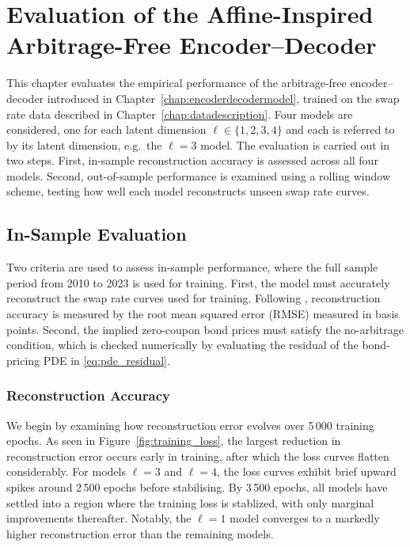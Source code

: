 \chapter{Evaluation of the Affine-Inspired Arbitrage-Free Encoder--Decoder}
\label{chap:evaluation}

This chapter evaluates the empirical performance of the arbitrage-free encoder--decoder introduced in Chapter~\ref{chap:encoderdecodermodel}, trained on the swap rate data described in Chapter~\ref{chap:datadescription}. Four models are considered, one for each latent dimension $\ell \in \{1,2,3,4\}$ and each is referred to by its latent dimension, e.g.\ the $\ell=3$ model. The evaluation is carried out in two steps. First, in-sample reconstruction accuracy
is assessed across all four models. Second, out-of-sample performance is
examined using a rolling window scheme, testing how well each model reconstructs
unseen swap rate curves.


\section{In-Sample Evaluation}
\label{sec:ISevaluation}

Two criteria are used to assess in-sample performance, where the full sample period from 2010 to 2023 is used for training. First, the model must accurately reconstruct the swap rate curves used for training. Following \citet{MatinWanPoulsen2025}, reconstruction accuracy is measured by the root mean squared error (RMSE) measured in basis points. Second, the implied zero-coupon bond prices must satisfy the no-arbitrage condition, which is checked numerically by evaluating the residual of the bond-pricing PDE in \eqref{eq:pde_residual}. 

\subsection{Reconstruction Accuracy}
\label{subsec:reconstruction_accuracy} 

We begin by examining how reconstruction error evolves over 5\,000 training epochs. As seen in Figure~\ref{fig:training_loss}, the largest reduction in reconstruction error occurs early in training, after which the loss curves flatten considerably. For models $\ell=3$ and $\ell=4$, the loss curves exhibit brief upward spikes around 2\,500 epochs before stabilising. By 3\,500 epochs, all models have settled into a region where the training loss is stablized, with only marginal improvements thereafter. Notably, the $\ell=1$ model converges to a markedly higher reconstruction error than the remaining models.

